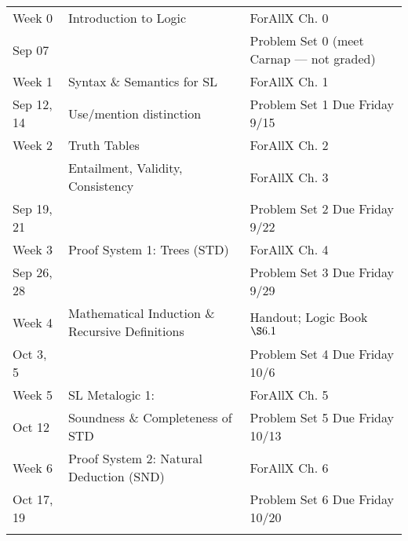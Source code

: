 \documentclass[letterpaper]{inzane_syllabus} %
\begin{document}
\begin{center}
\begin{tabularx}{\textwidth}{p{2.5cm}p{8cm}p{9cm}} %
\arrayrulecolor{myCOLOR}\hline
\multicolumn{3}{l}{\textbf{\textcolor{myCOLOR}{\large Part 1: Sentential Logic}}} \\
\hline

Week 0 & Introduction to Logic & ForAllX Ch. 0 \\
Sep 07 & & Problem Set 0 (meet Carnap --- not graded)\\
\arrayrulecolor{maingray}\hline

Week 1 & Syntax \& Semantics for SL & ForAllX Ch. 1\\
Sep 12, 14 & Use/mention distinction & Problem Set 1 Due Friday 9/15  \\
\arrayrulecolor{maingray}\hline

Week 2 & Truth Tables & ForAllX Ch. 2 \\
& Entailment, Validity, Consistency & ForAllX Ch. 3 \\
Sep 19, 21 & & Problem Set 2 Due Friday 9/22 \\
\arrayrulecolor{maingray}\hline

Week 3 & Proof System 1: Trees (STD) & ForAllX Ch. 4 \\
Sep 26, 28 & & Problem Set 3 Due Friday 9/29 \\
\arrayrulecolor{maingray}\hline

Week 4 & Mathematical Induction \& Recursive Definitions & Handout; Logic Book $\S6.1$\\
Oct 3, 5 & & Problem Set 4 Due Friday 10/6\\
\arrayrulecolor{maingray}\hline

Week 5 & SL Metalogic 1: & ForAllX Ch. 5 \\
Oct 12 & Soundness \& Completeness of STD & Problem Set 5 Due Friday 10/13 \\
\arrayrulecolor{maingray}\hline

Week 6 & Proof System 2: Natural Deduction (SND) & ForAllX Ch. 6 \\
Oct 17, 19 & &  Problem Set 6 Due Friday 10/20\\
\arrayrulecolor{myCOLOR}\hline


\end{tabularx}
\end{center}
\end{document}
